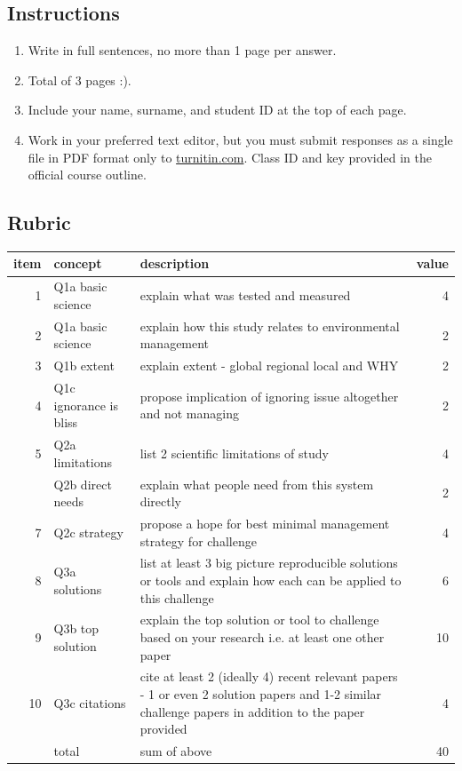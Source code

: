 \documentclass[
]{book}
\providecommand{\tightlist}{%
  \setlength{\itemsep}{0pt}\setlength{\parskip}{0pt}}
\begin{document}
\hypertarget{instructions-1}{%
\subsection*{Instructions}\label{instructions-1}}

\begin{enumerate}
\def\labelenumi{\arabic{enumi}.}
\tightlist
\item
  Write in full sentences, no more than 1 page per answer.
\item
  Total of 3 pages :).\\
\item
  Include your name, surname, and student ID at the top of each page.
\item
  Work in your preferred text editor, but you must submit responses as a single file in PDF format only to \href{https://www.turnitin.com}{turnitin.com}. Class ID and key provided in the official course outline.
\end{enumerate}

\hypertarget{rubric}{%
\subsection*{Rubric}\label{rubric}}

\begin{tabular}{rllr}
\toprule
item & concept & description & value\\
\midrule
1 & Q1a basic science & explain what was tested and measured & 4\\
2 & Q1a basic science & explain how this study relates to environmental management & 2\\
3 & Q1b extent & explain extent - global regional local and WHY & 2\\
4 & Q1c ignorance is bliss & propose implication of ignoring issue altogether and not managing & 2\\
5 & Q2a limitations & list 2 scientific limitations of study & 4\\
\addlinespace
6 & Q2b direct needs & explain what people need from this system directly & 2\\
7 & Q2c strategy & propose a hope for best minimal management strategy for challenge & 4\\
8 & Q3a solutions & list at least 3 big picture reproducible solutions or tools and explain how each can be applied to this challenge & 6\\
9 & Q3b top solution & explain the top solution or tool to challenge based on your research i.e. at least one other paper & 10\\
10 & Q3c citations & cite at least 2 (ideally 4) recent relevant papers - 1 or even 2 solution papers and 1-2 similar challenge papers in addition to the paper provided & 4\\
\addlinespace
11 & total & sum of above & 40\\
\bottomrule
\end{tabular}
\end{document}
